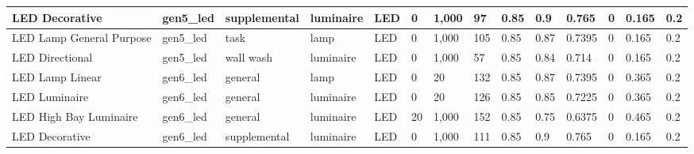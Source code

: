 \begin{center}
\begin{landscape}
\begin{longtable}{|p{0.75in}|p{0.65in}|p{0.47in}|p{0.4in}|p{0.45in}|p{0.4in}|p{0.4in}|p{0.4in}|p{0.4in}|p{0.4in}|p{0.4in}|p{0.4in}|p{0.4in}|p{0.4in}|}
  LED Decorative             & gen5\_led               & supplemental           & luminaire     & LED                     & 0                     & 1,000                  & 97                              & 0.85                    & 0.9                         & 0.765                & 0                   & 0.165            & 0.2              \\ \hline
  LED Lamp General Purpose   & gen5\_led               & task                   & lamp          & LED                     & 0                     & 1,000                  & 105                             & 0.85                    & 0.87                        & 0.7395               & 0                   & 0.165            & 0.2              \\ \hline
  LED Directional            & gen5\_led               & wall wash              & luminaire     & LED                     & 0                     & 1,000                  & 57                              & 0.85                    & 0.84                        & 0.714                & 0                   & 0.165            & 0.2              \\ \hline
  LED Lamp Linear            & gen6\_led               & general                & lamp          & LED                     & 0                     & 20                    & 132                             & 0.85                    & 0.87                        & 0.7395               & 0                   & 0.365            & 0.2              \\ \hline
  LED Luminaire              & gen6\_led               & general                & luminaire     & LED                     & 0                     & 20                    & 126                             & 0.85                    & 0.85                        & 0.7225               & 0                   & 0.365            & 0.2              \\ \hline
  LED High Bay Luminaire     & gen6\_led               & general                & luminaire     & LED                     & 20                    & 1,000                  & 152                             & 0.85                    & 0.75                        & 0.6375               & 0                   & 0.465            & 0.2              \\ \hline
  LED Decorative             & gen6\_led               & supplemental           & luminaire     & LED                     & 0                     & 1,000                  & 111                             & 0.85                    & 0.9                         & 0.765                & 0                   & 0.165            & 0.2              \\ \hline

\end{longtable}
\end{landscape}
\end{center}
